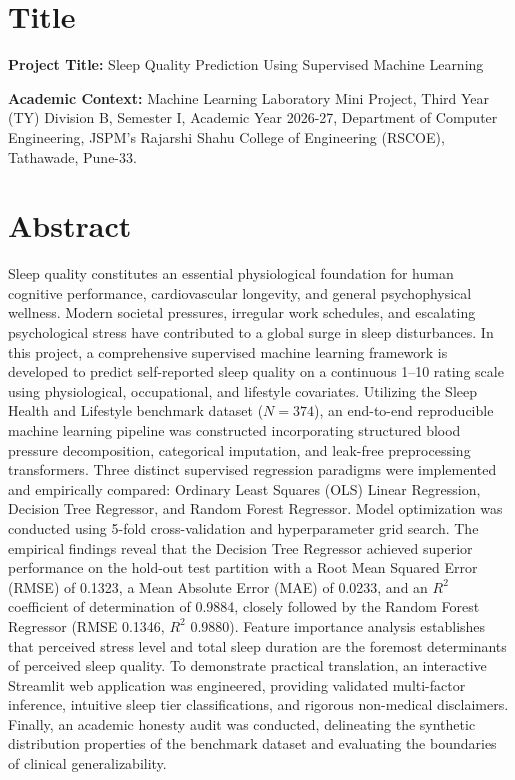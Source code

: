 \documentclass[12pt,a4paper]{article}
\newcommand{\projectTitle}{Sleep Quality Prediction Using Supervised Machine Learning}
\begin{document}
\newpage
\tableofcontents
\newpage

\section{Title}
\noindent \textbf{Project Title:} \projectTitle

\vspace{0.3cm}
\noindent \textbf{Academic Context:} Machine Learning Laboratory Mini Project, Third Year (TY) Division B, Semester I, Academic Year 2026-27, Department of Computer Engineering, JSPM's Rajarshi Shahu College of Engineering (RSCOE), Tathawade, Pune-33.

\section{Abstract}
Sleep quality constitutes an essential physiological foundation for human cognitive performance, cardiovascular longevity, and general psychophysical wellness. Modern societal pressures, irregular work schedules, and escalating psychological stress have contributed to a global surge in sleep disturbances. In this project, a comprehensive supervised machine learning framework is developed to predict self-reported sleep quality on a continuous 1--10 rating scale using physiological, occupational, and lifestyle covariates. Utilizing the Sleep Health and Lifestyle benchmark dataset ($N=374$), an end-to-end reproducible machine learning pipeline was constructed incorporating structured blood pressure decomposition, categorical imputation, and leak-free preprocessing transformers. Three distinct supervised regression paradigms were implemented and empirically compared: Ordinary Least Squares (OLS) Linear Regression, Decision Tree Regressor, and Random Forest Regressor. Model optimization was conducted using 5-fold cross-validation and hyperparameter grid search. The empirical findings reveal that the Decision Tree Regressor achieved superior performance on the hold-out test partition with a Root Mean Squared Error (RMSE) of 0.1323, a Mean Absolute Error (MAE) of 0.0233, and an $R^2$ coefficient of determination of 0.9884, closely followed by the Random Forest Regressor (RMSE 0.1346, $R^2$ 0.9880). Feature importance analysis establishes that perceived stress level and total sleep duration are the foremost determinants of perceived sleep quality. To demonstrate practical translation, an interactive Streamlit web application was engineered, providing validated multi-factor inference, intuitive sleep tier classifications, and rigorous non-medical disclaimers. Finally, an academic honesty audit was conducted, delineating the synthetic distribution properties of the benchmark dataset and evaluating the boundaries of clinical generalizability.
\end{document}
